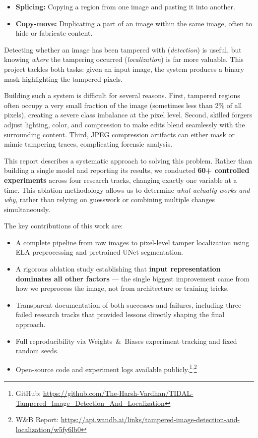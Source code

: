 \documentclass[conference]{IEEEtran}
\begin{document}
\begin{itemize}
    \item \textbf{Splicing:} Copying a region from one image and pasting it into another.
    \item \textbf{Copy-move:} Duplicating a part of an image within the same image, often to hide or fabricate content.
\end{itemize}

Detecting whether an image has been tampered with (\textit{detection}) is useful, but knowing \textit{where} the tampering occurred (\textit{localization}) is far more valuable. This project tackles both tasks: given an input image, the system produces a binary mask highlighting the tampered pixels.

Building such a system is difficult for several reasons. First, tampered regions often occupy a very small fraction of the image (sometimes less than 2\% of all pixels), creating a severe class imbalance at the pixel level. Second, skilled forgers adjust lighting, color, and compression to make edits blend seamlessly with the surrounding content. Third, JPEG compression artifacts can either mask or mimic tampering traces, complicating forensic analysis.

This report describes a systematic approach to solving this problem. Rather than building a single model and reporting its results, we conducted \textbf{60+ controlled experiments} across four research tracks, changing exactly one variable at a time. This ablation methodology allows us to determine \textit{what actually works and why}, rather than relying on guesswork or combining multiple changes simultaneously.

The key contributions of this work are:
\begin{itemize}
    \item A complete pipeline from raw images to pixel-level tamper localization using ELA preprocessing and pretrained UNet segmentation.
    \item A rigorous ablation study establishing that \textbf{input representation dominates all other factors} --- the single biggest improvement came from how we preprocess the image, not from architecture or training tricks.
    \item Transparent documentation of both successes and failures, including three failed research tracks that provided lessons directly shaping the final approach.
    \item Full reproducibility via Weights~\&~Biases experiment tracking and fixed random seeds.
    \item Open-source code and experiment logs available publicly.\footnote{GitHub: \url{https://github.com/The-Harsh-Vardhan/TIDAL-Tampered_Image_Detection_And_Localization}}\textsuperscript{,}\footnote{W\&B Report: \url{https://api.wandb.ai/links/tampered-image-detection-and-localization/w5fy6lb0}}
\end{itemize}
\end{document}
